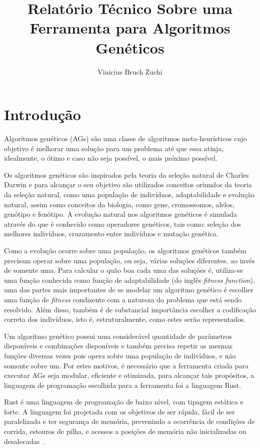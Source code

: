 \documentclass[12pt]{article}
\title{Relatório Técnico Sobre uma Ferramenta para Algoritmos Genéticos}
\author{Vinicius Bruch Zuchi\inst{1} }
\begin{document}
 
\maketitle

\section{Introdução}

Algoritmos genéticos (AGs) são uma classe de algoritmos meta-heurísticos cujo objetivo é melhorar uma solução para um problema até que essa 
atinja, idealmente, o ótimo e caso não seja possível, o mais próximo possível.

Os algoritmos genéticos são inspirados pela teoria da seleção natural de Charles Darwin e para alcançar o seu objetivo são utilizados 
conceitos oriundos da teoria da seleção natural, como uma população de indivíduos, adaptabilidade e evolução natural, assim como conceitos 
da biologia, como gene, cromossomos, alelos, genótipo e fenótipo. A evolução natural nos algoritmos genéticos é simulada através do que é 
conhecido como operadores genéticos, tais como: seleção dos melhores indivíduos, cruzamento entre indivíduos e mutação genética.

Como a evolução ocorre sobre uma população, os algoritmos genéticos também precisam operar sobre uma população, ou seja, várias soluções 
diferentes, ao invés de somente uma. Para calcular o quão boa cada uma das soluções é, utiliza-se uma função conhecida como função de 
adaptabilidade (do inglês \textit{fitness function}), uma das partes mais importantes de se modelar um algoritmo genético é escolher uma 
função de \textit{fitness} condizente com a natureza do problema que está sendo resolvido. Além disso, também é de substancial importância 
escolher a codificação correta dos indivíduos, isto é, estruturalmente, como estes serão representados.

Um algoritmo genético possui uma considerável quantidade de parâmetros disponíveis e combinações disponíveis e também precisa repetir 
as mesmas funções diversas vezes pois opera sobre uma população de indivíduos, e não somente sobre um. Por estes motivos, é necessário 
que a ferramenta criada para executar AGs seja modular, eficiente e otimizada, para alcançar tais propósitos, a linguagem de programação 
escolhida para a ferramenta foi a linguagem Rust.

Rust é uma linguagem de programação de baixo nível, com tipagem estática e forte. A linguagem foi projetada com os objetivos 
de ser rápida, fácil de ser paralelizada e ter segurança de memória, prevenindo a ocorrência de condições de corrida, estouros 
de pilha, e acessos a posições de memória não inicializadas ou desalocadas~\cite{Matsakis:2014:RL:2692956.2663188}. 
\end{document}
